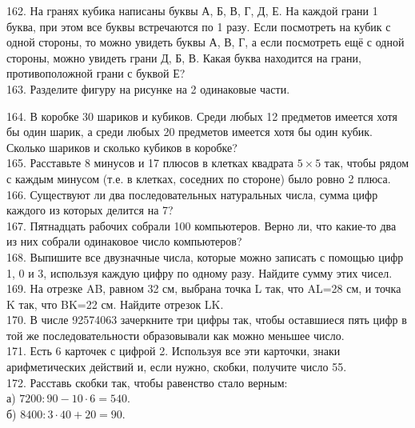 \begin{center}
\begin{figure}[ht!]
\end{figure}
\end{center}
162. На гранях кубика написаны буквы А, Б, В, Г, Д, Е. На каждой грани 1 буква, при этом все буквы встречаются по 1 разу. Если посмотреть на кубик с одной стороны, то можно увидеть буквы А, В, Г, а если посмотреть ещё с одной стороны, можно увидеть грани Д, Б, В. Какая буква находится на грани, противоположной грани с буквой Е?\\
163. Разделите фигуру на рисунке на 2 одинаковые части.
\begin{center}
\begin{figure}[ht!]
\end{figure}
\end{center}
164. В коробке 30 шариков и кубиков. Среди любых 12 предметов имеется хотя бы один шарик, а среди любых 20 предметов имеется хотя бы один кубик. Сколько шариков и сколько кубиков в коробке?\\
165. Расставьте 8 минусов и 17 плюсов в клетках квадрата $5\times5$ так, чтобы рядом с каждым минусом (т.е. в клетках, соседних по стороне) было ровно 2 плюса.\\
166. Существуют ли два последовательных натуральных числа, сумма цифр каждого из которых делится на 7?\\
167. Пятнадцать рабочих собрали 100 компьютеров. Верно ли, что какие-то два из них собрали одинаковое число компьютеров?\\
168. Выпишите все двузначные числа, которые можно записать с помощью цифр 1, 0 и 3, используя каждую цифру по одному разу. Найдите сумму этих чисел.\\
169. На отрезке AB, равном 32 см, выбрана точка L так, что AL=28 см, и точка K так, что BK=22 см. Найдите отрезок LK.\\
170. В числе 92574063 зачеркните три цифры так, чтобы оставшиеся пять цифр в той же последовательности образовывали как можно меньшее число.\\
171. Есть 6 карточек с цифрой 2. Используя все эти карточки, знаки арифметических действий и, если нужно, скобки, получите число 55.\\
172. Расставь скобки так, чтобы равенство стало верным:\\
а) $7200:90-10\cdot6=540.$\\
б) $8400:3\cdot40+20=90.$\\
